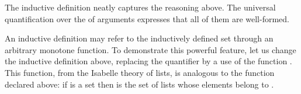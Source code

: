 \begin{isabellebody}
\begin{isamarkuptext}%
The inductive definition neatly captures the reasoning above.
The universal quantification over the
 of arguments expresses that all of them are well-formed.%
%
\end{isamarkuptext}%
\isamarkuptrue%
%
\isamarkuptrue%
%
\begin{isamarkuptext}%
% 
An inductive definition may refer to the
inductively defined  set through an arbitrary monotone function.  To
demonstrate this powerful feature, let us
change the  inductive definition above, replacing the
quantifier by a use of the function . This
function, from the Isabelle theory of lists, is analogous to the
function  declared above: if  is a set then
 is the set of lists whose elements belong to
.  


\end{isamarkuptext}
\end{isabellebody}
